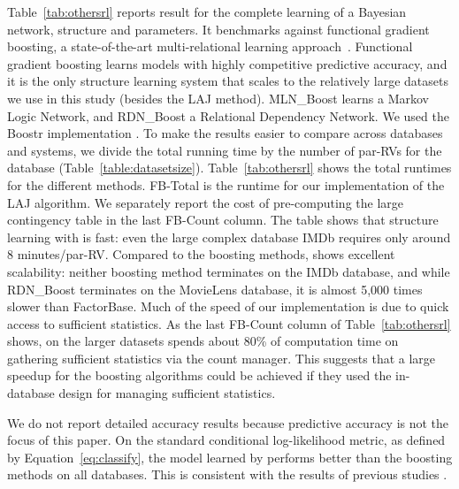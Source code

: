 Table~\ref{tab:othersrl} reports result for the complete learning of a Bayesian network, structure and parameters. It benchmarks \FB  against functional gradient boosting, a state-of-the-art  multi-relational learning approach~\cite{Natarajan2012}. Functional gradient boosting learns models with highly competitive predictive accuracy, and it is the only structure learning system that scales to the relatively large datasets we use in this study (besides the LAJ method).
MLN\_Boost learns a Markov Logic Network, and RDN\_Boost a Relational Dependency Network. 
We used the Boostr implementation \cite{Khot2013}. 
To make the results easier to compare across databases and systems, we divide the total running time by the number of par-RVs for the database (Table~\ref{table:datasetsize}). 
Table~\ref{tab:othersrl} shows the total runtimes for the different methods. FB-Total is the runtime for our \FB implementation of the LAJ algorithm. We separately report the cost of pre-computing the large contingency table in the last FB-Count column. The table shows that structure learning with \FB  is fast: even the large complex database IMDb requires only around 8 minutes/par-RV. Compared to the boosting methods, \FB  shows excellent scalability: neither boosting method terminates on the IMDb database, and while RDN\_Boost terminates on the MovieLens database, it is almost 5,000 times slower than {\sc FactorBase}. 
Much of the speed of our implementation is due to quick access to sufficient statistics. As the last FB-Count column of Table~\ref{tab:othersrl} shows, on the larger datasets \FB  spends about 80\% of computation time on gathering sufficient statistics via the count manager. This suggests that a large  speedup for the boosting algorithms could be achieved if they used the \FB  in-database design for managing sufficient statistics. 

We do not report detailed accuracy results because predictive accuracy is not the focus of this paper. On the standard conditional log-likelihood metric, as defined by Equation~\ref{eq:classify}, the model learned by \FB  performs better than the boosting methods on all databases. This is consistent with the results of previous studies \cite{Schulte2012}.

